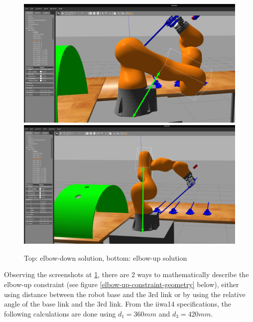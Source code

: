 \begin{center}
\begin{figure}[!htb]
\centering
\includegraphics[width=\textwidth]{images/elbow-down.png}\\
\includegraphics[width=\textwidth]{images/elbow-up.png}\\
\caption{Top: elbow-down solution, bottom: elbow-up solution}
\label{elbow-up-vs-down}
\end{figure}
\end{center}

Observing the screenshots at \ref{elbow-up-vs-down}, there are 2 ways to mathematically describe the elbow-up constraint (see figure \ref{elbow-up-constraint-geometry} below), either using distance between the robot base and 
the 3rd link or by using the relative angle of the base link and the 3rd link. From the iiwa14 specifications, the following calculations are done using $d_1 = 360mm$ and $d_3 = 420mm$.

